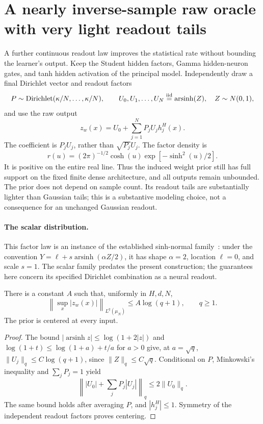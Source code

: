 \section{A nearly inverse-sample raw oracle with very light readout tails}
\label{sec:asinh-readout}
A further continuous readout law improves the statistical rate without
bounding the learner's output. Keep the Student hidden factors, Gamma
hidden-neuron gates, and tanh hidden activation of the principal model.
Independently draw a final Dirichlet vector and readout factors
\[
 P\sim\operatorname{Dirichlet}(\kappa/N,\ldots,\kappa/N),\qquad
 U_0,U_1,\ldots,U_N\stackrel{\rm iid}=\operatorname{arsinh}(Z),
 \quad Z\sim N(0,1),
\]
and use the raw output
\begin{equation}
 z_w(x)=U_0+\sum_{j=1}^NP_jU_jh_j^H(x).
 \label{eq:asinh-readout}
\end{equation}
The coefficient is $P_jU_j$, rather than $\sqrt{P_j}U_j$.
The factor density is
\[
 r(u)=(2\pi)^{-1/2}\cosh(u)\exp[-\sinh^2(u)/2].
\]
It is positive on the entire real line. Thus the induced weight prior
still has full support on the fixed finite dense architecture, and all
outputs remain unbounded. The prior does not depend on sample count.
Its readout tails are substantially lighter than Gaussian tails; this
is a substantive modeling choice, not a consequence for an unchanged
Gaussian readout.

\paragraph{The scalar distribution.}
This factor law is an instance of the established sinh-normal
family~\cite{sinh-normal}: under the convention
$Y=\ell+s\operatorname{arsinh}(\alpha Z/2)$, it has shape
$\alpha=2$, location $\ell=0$, and scale $s=1$.
The scalar family predates the present construction; the guarantees
here concern its specified Dirichlet combination as a neural readout.

\begin{lemma}
\label{lem:asinh-native}
There is a constant $A$ such that, uniformly in $H,d,N$,
\[
 \left\|\sup_x|z_w(x)|\right\|_{L^q(\mu_N)}
       \le A\log(q+1),\qquad q\ge1.
\]
The prior is centered at every input.
\end{lemma}
\begin{proof}
The bound $|\operatorname{arsinh}z|\le\log(1+2|z|)$ and
$\log(1+t)\le\log(1+a)+t/a$ for $a>0$ give, at $a=\sqrt q$,
$\|U_j\|_q\le C\log(q+1)$, since $\|Z\|_q\le C\sqrt q$.
Conditional on $P$, Minkowski's inequality and $\sum_jP_j=1$ yield
\[
 \left\||U_0|+\sum_jP_j|U_j|\right\|_q
       \le2\|U_0\|_q.
\]
The same bound holds after averaging $P$, and $|h_j^H|\le1$.
Symmetry of the independent readout factors proves centering.
\end{proof}

